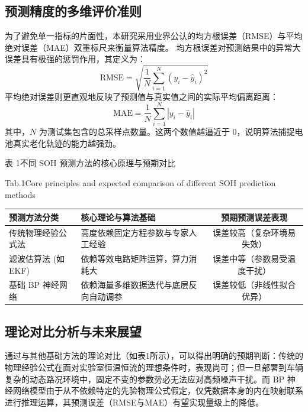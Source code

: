 \documentclass[10pt, a4paper, twocolumn]{ctexart}
\begin{document}
\subsection{预测精度的多维评价准则}
为了避免单一指标的片面性，本研究采用业界公认的均方根误差（RMSE）与平均绝对误差（MAE）双重标尺来衡量算法精度。
均方根误差对预测结果中的异常大误差具有极强的惩罚作用，其定义为：
\begin{equation}
    \text{RMSE} = \sqrt{\frac{1}{N}\sum_{i=1}^{N}(y_i - \hat{y}_i)^2} 
\end{equation}
平均绝对误差则更直观地反映了预测值与真实值之间的实际平均偏离距离：
\begin{equation}
    \text{MAE} = \frac{1}{N}\sum_{i=1}^{N}|y_i - \hat{y}_i| 
\end{equation}
其中，$N$ 为测试集包含的总采样点数量。这两个数值越逼近于 0，说明算法捕捉电池真实老化轨迹的能力越强劲。

\begin{table}[H]
    \centering
    {\heiti 表 1\quad 不同 SOH 预测方法的核心原理与预期对比\par}
    { Tab.1\quad Core principles and expected comparison of different SOH prediction methods\par}
    \vspace{0.5em}
    { 
    \begin{tabular}{llc}
        \toprule
        预测方法分类 & 核心理论与算法基础 & 预期预测误差表现 \\
        \midrule
        传统物理经验公式法 & 高度依赖固定方程参数与专家人工经验 & 误差较高（复杂环境易失效） \\
        滤波估算法 (如 EKF) & 依赖等效电路矩阵运算，算力消耗大 & 误差中等（参数易受温度干扰） \\
        基础 BP 神经网络 & 依赖海量多维数据迭代与底层反向自动调参 & 误差较低（非线性拟合优异） \\
        \bottomrule
    \end{tabular}
    }
\end{table}

\subsection{理论对比分析与未来展望}
通过与其他基础方法的理论对比（如表1所示），可以得出明确的预期判断：传统的物理经验公式在面对实验室恒温恒流的理想条件时，表现尚可；但一旦部署到车辆复杂的动态路况环境中，固定不变的参数势必无法应对高频噪声干扰。而 BP 神经网络模型由于从不依赖特定的先验物理公式假定，仅凭数据本身的内在映射联系进行推理运算，其预测误差（RMSE与MAE）有望实现量级上的降低。
\end{document}
